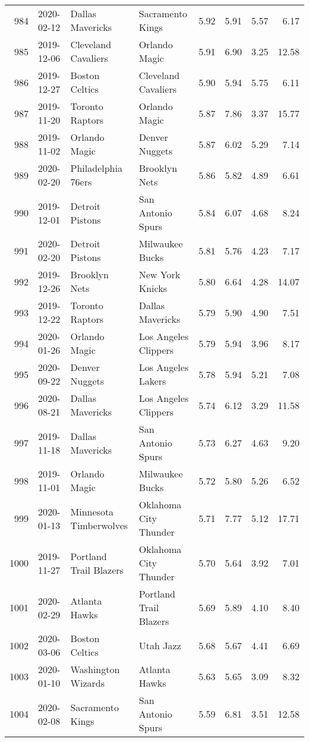 \documentclass[
  11pt,
]{article}
\theoremstyle{nonumberplain}
\begin{document}
\begin{longtable}{rl|llr|rrr}
984 & 2020-02-12 & Dallas Mavericks & Sacramento Kings & 5.92 & 5.91 & 5.57 & 6.17\\
985 & 2019-12-06 & Cleveland Cavaliers & Orlando Magic & 5.91 & 6.90 & 3.25 & 12.58\\
986 & 2019-12-27 & Boston Celtics & Cleveland Cavaliers & 5.90 & 5.94 & 5.75 & 6.11\\
987 & 2019-11-20 & Toronto Raptors & Orlando Magic & 5.87 & 7.86 & 3.37 & 15.77\\
988 & 2019-11-02 & Orlando Magic & Denver Nuggets & 5.87 & 6.02 & 5.29 & 7.14\\
989 & 2020-02-20 & Philadelphia 76ers & Brooklyn Nets & 5.86 & 5.82 & 4.89 & 6.61\\
990 & 2019-12-01 & Detroit Pistons & San Antonio Spurs & 5.84 & 6.07 & 4.68 & 8.24\\
991 & 2020-02-20 & Detroit Pistons & Milwaukee Bucks & 5.81 & 5.76 & 4.23 & 7.17\\
992 & 2019-12-26 & Brooklyn Nets & New York Knicks & 5.80 & 6.64 & 4.28 & 14.07\\
993 & 2019-12-22 & Toronto Raptors & Dallas Mavericks & 5.79 & 5.90 & 4.90 & 7.51\\
994 & 2020-01-26 & Orlando Magic & Los Angeles Clippers & 5.79 & 5.94 & 3.96 & 8.17\\
995 & 2020-09-22 & Denver Nuggets & Los Angeles Lakers & 5.78 & 5.94 & 5.21 & 7.08\\
996 & 2020-08-21 & Dallas Mavericks & Los Angeles Clippers & 5.74 & 6.12 & 3.29 & 11.58\\
997 & 2019-11-18 & Dallas Mavericks & San Antonio Spurs & 5.73 & 6.27 & 4.63 & 9.20\\
998 & 2019-11-01 & Orlando Magic & Milwaukee Bucks & 5.72 & 5.80 & 5.26 & 6.52\\
999 & 2020-01-13 & Minnesota Timberwolves & Oklahoma City Thunder & 5.71 & 7.77 & 5.12 & 17.71\\
1000 & 2019-11-27 & Portland Trail Blazers & Oklahoma City Thunder & 5.70 & 5.64 & 3.92 & 7.01\\
1001 & 2020-02-29 & Atlanta Hawks & Portland Trail Blazers & 5.69 & 5.89 & 4.10 & 8.40\\
1002 & 2020-03-06 & Boston Celtics & Utah Jazz & 5.68 & 5.67 & 4.41 & 6.69\\
1003 & 2020-01-10 & Washington Wizards & Atlanta Hawks & 5.63 & 5.65 & 3.09 & 8.32\\
1004 & 2020-02-08 & Sacramento Kings & San Antonio Spurs & 5.59 & 6.81 & 3.51 & 12.58\\

\end{longtable}
\end{document}
